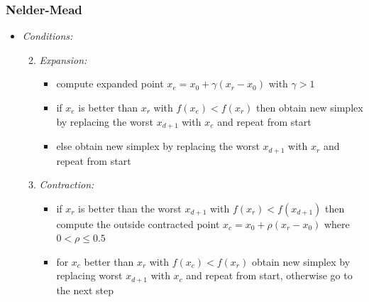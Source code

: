 	\begin{frame}[noframenumbering]
		\frametitle{Nelder-Mead}
		\begin{itemize}
			\item<2-> \itshape{Conditions:}
				\begin{enumerate}
					\setcounter{enumi}{1}
					\item<3-> \itshape{Expansion:}
					\begin{itemize}
						\item<4-> compute expanded point $x_e = x_0 + \gamma(x_r - x_0)$ with $\gamma > 1$
						\item<5-> if $x_e$ is better than $x_r$ with $f(x_e) < f(x_r)$ then obtain new simplex by replacing the worst $x_{d+1}$
								   with $x_e$ and repeat from start
						\item<6-> else obtain new simplex by replacing the worst $x_{d+1}$ with $x_r$ and repeat from start
					\end{itemize}
					\item<7-> \itshape{Contraction:}
					\begin{itemize}
						\item<8-> if $x_r$ is better than the worst $x_{d+1}$ with $f(x_r) < f(x_{d+1})$ then compute the outside contracted point
								  $x_c = x_0 + \rho (x_r - x_0)$ where $0 < \rho \leq 0.5$
						\item<9-> for $x_c$ better than $x_r$ with $f(x_c) < f(x_r)$ obtain new simplex by replacing worst $x_{d+1}$ with $x_c$
								  and repeat from start, otherwise go to the next step
					\end{itemize}
				\end{enumerate}
		\end{itemize}
	\end{frame}

